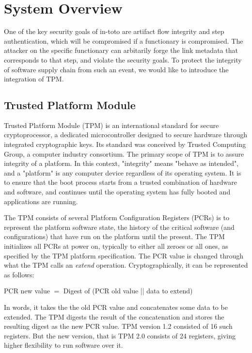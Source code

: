 \section{System Overview}
One of the key security goals of in-toto are artifact flow integrity and step authentication, which will be compromised if a functionary is compromised. The attacker on the specific functionary can arbitarily forge the link metadata that corresponds to that step, and violate the security goals. To protect the integrity of software supply chain from such an event, we would like to introduce the integration of TPM.

\subsection{Trusted Platform Module}
Trusted Platform Module (TPM) is an international standard for secure cryptoprocessor, a dedicated microcontroller designed to secure hardware through integrated cryptographic keys. Its standard was conceived by Trusted Computing Group, a computer industry consortium. The primary scope of TPM is to assure integrity of a platform. In this context, "integrity" means "behave as intended", and a "platform" is any computer device regardless of its operating system. It is to ensure that the boot process starts from a trusted combination of hardware and software, and continues until the operating system has fully booted and applications are running.

The TPM consists of several Platform Configuration Registers (PCRs) is to represent the platform software state, the history of the critical software (and configurations) that have run on the platform until the present. The TPM initializes all PCRs at power on, typically to either all zeroes or all ones, as specified by the TPM platform specification. The PCR value is changed through what the TPM calls an \textit{extend} operation. Cryptographically, it can be represented as follows:

PCR new value $=$ Digest of (PCR old value || data to extend)

In words, it takes the the old PCR value and concatenates some data to be extended. The TPM digests the result of the concatenation and stores the resulting digest as the new PCR value. TPM version 1.2 consisted of 16 such registers. But the new version, that is TPM 2.0 consists of 24 registers, giving higher flexibility to run software over it.
